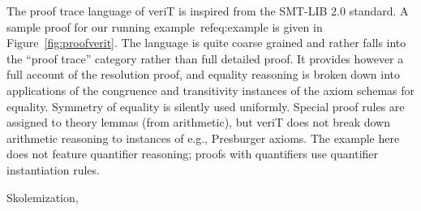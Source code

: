 \documentclass{llncs}
\begin{document}
The proof trace language of veriT is inspired from the SMT-LIB 2.0 standard.  A
sample proof for our running example~ref{eq:example} is given in
Figure~\ref{fig:proofverit}.  The language is quite coarse grained and rather
falls into the ``proof trace'' category rather than full detailed proof.  It
provides however a full account of the resolution proof, and equality reasoning
is broken down into applications of the congruence and transitivity instances of
the axiom schemas for equality.  Symmetry of equality is silently used
uniformly.  Special proof rules are assigned to theory lemmas (from arithmetic),
but veriT does not break down arithmetic reasoning to instances of
e.g., Presburger axioms.  The example here does not feature quantifier
reasoning; proofs with quantifiers use quantifier instantiation rules.

Skolemization,
\end{document}
